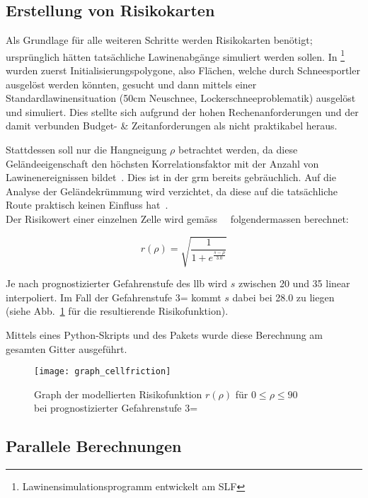 \pagebreak
\subsection{Erstellung von Risikokarten}

Als Grundlage für alle weiteren Schritte werden Risikokarten benötigt; ursprünglich hätten tatsächliche Lawinenabgänge simuliert werden sollen. In \footnote{Lawinensimulationsprogramm entwickelt am SLF} wurden zuerst Initialisierungspolygone, also Flächen, welche durch Schneesportler ausgelöst werden könnten, gesucht und dann mittels einer Standardlawinensituation (50cm Neuschnee, Lockerschneeproblematik) ausgelöst und simuliert. Dies stellte sich aufgrund der hohen Rechenanforderungen und der damit verbunden Budget- \& Zeitanforderungen als nicht praktikabel heraus.

Stattdessen soll nur die Hangneigung $\rho$ betrachtet werden, da diese Geländeeigenschaft den höchsten Korrelationsfaktor mit der Anzahl von Lawinenereignissen bildet~\cite{arpddatasetdocs}. Dies ist in der \gls{grm} bereits gebräuchlich. Auf die Analyse der Geländekrümmung wird verzichtet, da diese auf die tatsächliche Route praktisch keinen Einfluss hat~\cite{arpddatasetdocs}.\\
Der Risikowert einer einzelnen Zelle wird gemäss~\citeauthor{sacbergspwinterp99}~\cite{sacbergspwinterp99} folgendermassen berechnet:

\[
r(\rho) = \sqrt{\frac{1}{1 + e^{\frac{s-\rho}{3.0}}}}
\]

Je nach prognostizierter Gefahrenstufe des \gls{llb} wird $s$ zwischen 20 und 35 linear interpoliert. Im Fall der Gefahrenstufe 3= kommt $s$ dabei bei 28.0 zu liegen (siehe Abb.~\ref{fig:graph} für die resultierende Risikofunktion).

Mittels eines Python-Skripts und des Pakets  wurde diese Berechnung am gesamten Gitter ausgeführt.
\vfill
\begin{figure}[H]
  \centering
  \texttt{[image: graph\_cellfriction]}
  \caption{Graph der modellierten Risikofunktion $r(\rho)$ für $0 \leq \rho \leq 90$ \\bei prognostizierter Gefahrenstufe 3=}\label{fig:graph}
\end{figure}
\vfill

\pagebreak
\subsection{Parallele Berechnungen}

